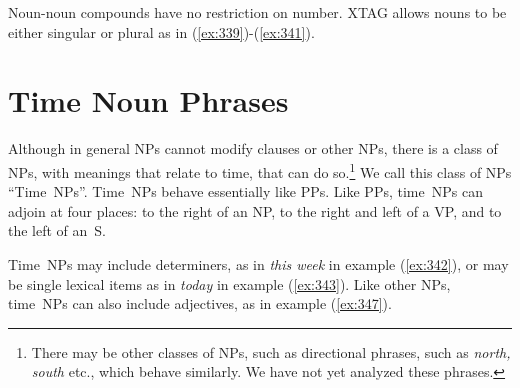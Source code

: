 \beginsentences
{}\label{ex:337} 
\endsentences

 
\beginsentences
{}\label{ex:338} 
\endsentences

 
Noun-noun compounds have no restriction on number.  XTAG allows nouns to be either singular or plural as in (\ref{ex:339})-(\ref{ex:341}). 
\beginsentences
{}\label{ex:339} 
\label{ex:340} 
\label{ex:341} 
\endsentences

 
\section{Time Noun Phrases} 
\label{timenps} 
 
 
 
Although in general NPs cannot modify clauses or other NPs, there is a 
class of NPs, with meanings that relate to time, that can do 
so.\footnote{ There may be other classes of NPs, such as directional phrases, such as {\em north, south} etc., which behave similarly. We have not yet analyzed these phrases.} We call this class of NPs 
``Time~NPs''.  Time~NPs behave essentially like PPs. Like PPs, 
time~NPs can adjoin at four places: to the right of an NP, to the 
right and left of a VP, and to the left of an~S. 
 
Time~NPs may include determiners, as in {\em this week} in example 
(\ref{ex:342}), or may be single lexical items as in {\em today} in example 
(\ref{ex:343}).  Like other NPs, time~NPs can also include adjectives, as in 
example (\ref{ex:347}). 
 
\beginsentences
{}\label{ex:342} 
\label{ex:343} 
\label{ex:344} 
\label{ex:345} 
\endsentences

\beginsentences
{}\label{ex:346} 
\label{ex:347} 
\endsentences

